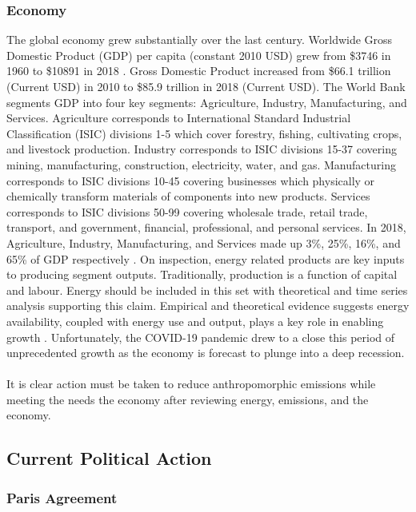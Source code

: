 \documentclass[12pt]{article}
\begin{document}
\subsubsection{Economy}
The global economy grew substantially over the last century. 
Worldwide Gross Domestic Product (GDP) per capita (constant 2010 USD) grew from \$3746 in 1960 to \$10891 in 2018 \cite{W:5}. 
Gross Domestic Product increased from \$66.1 trillion (Current USD) in 2010 to \$85.9 trillion in 2018 (Current USD). 
The World Bank segments GDP into four key segments: Agriculture, Industry, Manufacturing, and Services. 
Agriculture corresponds to International Standard Industrial Classification (ISIC) divisions 1-5 which cover forestry, fishing, cultivating crops, and livestock production. 
Industry corresponds to ISIC divisions 15-37 covering mining, manufacturing, construction, electricity, water, and gas.
Manufacturing corresponds to ISIC divisions 10-45 covering businesses which physically or chemically transform materials of components into new products. 
Services corresponds to ISIC divisions 50-99 covering wholesale trade, retail trade, transport, and government, financial, professional, and personal services. 
In 2018, Agriculture, Industry, Manufacturing, and Services made up 3\%, 25\%, 16\%, and 65\% of GDP respectively \cite{W:6}. 
On inspection, energy related products are key inputs to producing segment outputs. 
Traditionally, production is a function of capital and labour. 
Energy should be included in this set with theoretical and time series analysis supporting this claim. 
Empirical and theoretical evidence suggests energy availability, coupled with energy use and output, plays a key role in enabling growth \cite{J:4}.
Unfortunately, the COVID-19 pandemic drew to a close this period of unprecedented growth as the economy is forecast to plunge into a deep recession. \\\\
It is clear action must be taken to reduce anthropomorphic emissions while meeting the needs the economy after reviewing energy, emissions, and the economy.

\subsection{Current Political Action}
\subsubsection{Paris Agreement}
\end{document}
